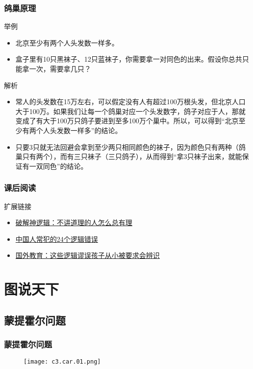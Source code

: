 \begin{frame}
  \frametitle{鸽巢原理}
  \begin{block}{举例}
    \begin{itemize}
      \item 北京至少有两个人头发数一样多。
      \item 盒子里有10只黑袜子、12只蓝袜子，你需要拿一对同色的出来。假设你总共只能拿一次，需要拿几只？
    \end{itemize}
  \end{block}
  \pause \pause \pause \pause
  \begin{block}{解析}
    \begin{itemize}
      \item 常人的头发数在15万左右，可以假定没有人有超过100万根头发，但北京人口大于100万。如果我们让每一个鸽巢对应一个头发数字，鸽子对应于人，那就变成了有大于100万只鸽子要进到至多100万个巢中。所以，可以得到“北京至少有两个人头发数一样多”的结论。
      \item 只要3只就无法回避会拿到至少两只相同颜色的袜子，因为颜色只有两种（鸽巢只有两个），而有三只袜子（三只鸽子），从而得到“拿3只袜子出来，就能保证有一双同色”的结论。
    \end{itemize}
  \end{block}
\end{frame}

\begin{frame}
  \frametitle{课后阅读}
  \begin{block}{扩展链接}
    \begin{itemize}
      \item \href{http://www.thepaper.cn/newsDetail_forward_1500302}{破解神逻辑：不讲道理的人怎么总有理}
      \item \href{https://wx.abbao.cn/a/5248-c37c59ef8e0cd008.html}{中国人常犯的24个逻辑错误}
      \item \href{http://www.edu0-6.com/zixunzhuanqu/xingyedongtai/2216.html}{国外教育：这些逻辑谬误孩子从小被要求会辨识}
    \end{itemize}
  \end{block}
\end{frame}

\section{图说天下}
\subsection{蒙提霍尔问题}
\begin{frame}
  \frametitle{蒙提霍尔问题}
  \begin{figure}
    \centering
    \texttt{[image: c3.car.01.png]}
  \end{figure}
\end{frame}

